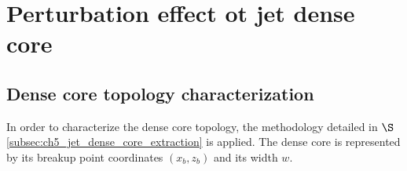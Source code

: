 \clearpage

\section{Perturbation effect ot jet dense core}
\label{ch8:sec_BIMER_DC_characterization}

\subsection{Dense core topology characterization}

In order to characterize the dense core topology, the methodology detailed in $\S$\ref{subsec:ch5_jet_dense_core_extraction} is applied. The dense core is represented by its breakup point coordinates $\left( x_b, z_b \right)$ and its width $w$.

